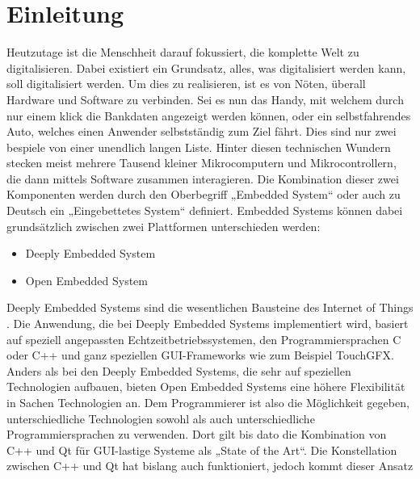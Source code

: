 \chapter{Einleitung}
\label{chap:einleitung}
Heutzutage ist die Menschheit darauf fokussiert, die komplette Welt zu digitalisieren. Dabei
existiert ein Grundsatz, alles, was digitalisiert werden kann, soll digitalisiert werden. Um dies
zu realisieren, ist es von Nöten, überall Hardware und Software zu verbinden. Sei es nun das
Handy, mit welchem durch nur einem klick die Bankdaten angezeigt werden können, oder ein
selbstfahrendes Auto, welches einen Anwender selbstständig zum Ziel fährt. Dies sind nur zwei
bespiele von einer unendlich langen Liste. Hinter diesen technischen Wundern stecken meist
mehrere Tausend kleiner Mikrocomputern und Mikrocontrollern, die dann mittels Software zusammen
interagieren. Die Kombination dieser zwei Komponenten werden durch den Oberbegriff „Embedded
System“ oder auch zu Deutsch ein „Eingebettetes System“ definiert.
\newline
\newline
Embedded Systems können dabei grundsätzlich zwischen zwei Plattformen unterschieden werden:
\begin{itemize}
    \item Deeply Embedded System
    \item Open Embedded System
\end{itemize}
\newline
\newline
Deeply Embedded Systems sind die wesentlichen Bausteine des Internet of Things
\cite{HochschuleniederrheimDeeply}. Die Anwendung,
die bei Deeply Embedded Systems implementiert wird, basiert auf speziell angepassten
Echtzeitbetriebssystemen, den Programmiersprachen C oder C++ und ganz speziellen GUI-Frameworks
wie zum Beispiel TouchGFX.
\newline
\newline
Anders als bei den Deeply Embedded Systems, die sehr auf speziellen Technologien aufbauen, bieten
Open Embedded Systems eine höhere Flexibilität in Sachen Technologien an. Dem Programmierer ist
also die Möglichkeit gegeben, unterschiedliche Technologien sowohl als auch unterschiedliche
Programmiersprachen zu verwenden. Dort gilt bis dato die Kombination von C++ und Qt für
GUI-lastige Systeme als „State of the Art“.
\newline
\newline
Die Konstellation zwischen C++ und Qt hat bislang auch funktioniert, jedoch kommt dieser Ansatz
